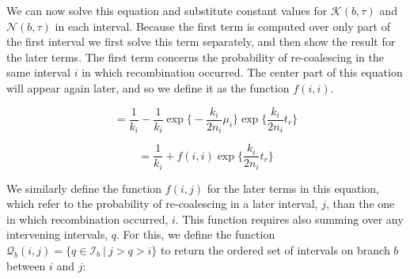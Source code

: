 \documentclass[11pt]{article}
\begin{document}
\noindent We can now solve this equation and substitute constant values for 
$\mathcal{K}(b,\tau)$ and $\mathcal{N}(b,\tau)$ in each interval. 
Because the first term is computed over only part of the first interval we 
first solve this term separately, and then show the result for the later terms.
The first term concerns the probability of re-coalescing in the same interval 
$i$ in which recombination occurred. The center part of this equation will 
appear again later, and so we define it as the function $f(i,i)$.

\begin{equation}
	= \frac{1}{k_i} - 
	  \frac{1}{k_i}
	  \exp \bigg\{-\frac{k_i}{2n_i} \mu_i \bigg\}
	  \exp \bigg\{\frac{k_i}{2n_i} t_r \bigg\}
\end{equation}

\begin{equation}
	= \frac{1}{k_i} + f(i,i) \exp \bigg\{\frac{k_i}{2n_i} t_r \bigg\}
\end{equation}


\noindent We similarly define the function $f(i,j)$ for the later terms in 
this equation, which refer to the  
probability of re-coalescing in a later interval, $j$, than the one 
in which recombination occurred, $i$. This function requires also summing over 
any intervening intervals, $q$. For this, we define the function 
$\mathcal{Q}_b(i,j) = \{q \in \mathcal{I}_b ~|~ j > q > i\}$
to return the ordered set of intervals on branch $b$ between $i$ and $j$: 
\end{document}
